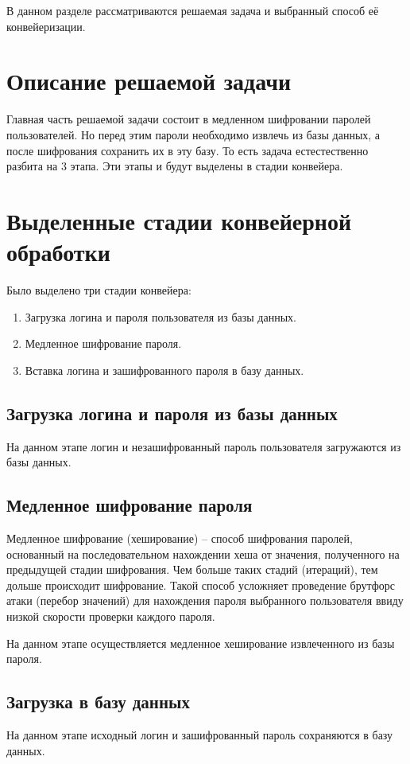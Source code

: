 \documentclass[../report.tex]{subfiles}
\begin{document}
В данном разделе рассматриваются решаемая задача и выбранный способ её конвейеризации.

\section{Описание решаемой задачи}
Главная часть решаемой задачи состоит в медленном шифровании паролей пользователей. Но перед этим пароли необходимо извлечь из базы данных, а после шифрования сохранить их в эту базу. То есть задача естестественно разбита на 3 этапа. Эти этапы и будут выделены в стадии конвейера.

\section{Выделенные стадии конвейерной обработки}
Было выделено три стадии конвейера:
\begin{enumerate}
	\item Загрузка логина и пароля пользователя из базы данных.
	\item Медленное шифрование пароля.
	\item Вставка логина и зашифрованного пароля в базу данных.
\end{enumerate}

\subsection{Загрузка логина и пароля из базы данных}
На данном этапе логин и незашифрованный пароль пользователя загружаются из базы данных.

\subsection{Медленное шифрование пароля}
Медленное шифрование (хеширование) -- способ шифрования паролей, основанный на последовательном нахождении хеша от значения, полученного на предыдущей стадии шифрования. Чем больше таких стадий (итераций), тем дольше происходит шифрование. Такой способ усложняет проведение брутфорс атаки (перебор значений) для нахождения пароля выбранного пользователя ввиду низкой скорости проверки каждого пароля.

На данном этапе осуществляется медленное хеширование извлеченного из базы пароля.

\subsection{Загрузка в базу данных}
На данном этапе исходный логин и зашифрованный пароль сохраняются в базу данных.
\end{document}
